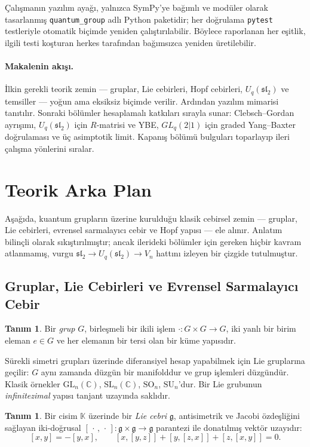 \documentclass[10pt]{math}
\numberwithin{equation}{section}
\theoremstyle{plain}
\theoremstyle{definition}
\newtheorem{definition}[theorem]{Tanım}
\renewcommand{\sl}{\mathfrak{sl}}
\newcommand{\gfrak}{\mathfrak{g}}
\newcommand{\Uq}{U_q(\sl_2)}
\newcommand{\K}{\mathbb{K}}
\newcommand{\C}{\mathbb{C}}
\newcommand{\GL}{\mathrm{GL}}
\newcommand{\SL}{\mathrm{SL}}
\begin{document}
Çalışmanın yazılım ayağı, yalnızca SymPy'ye bağımlı ve modüler olarak
tasarlanmış \texttt{quantum\_group} adlı Python paketidir; her doğrulama
\texttt{pytest} testleriyle otomatik biçimde yeniden çalıştırılabilir. Böylece raporlanan her eşitlik, ilgili
testi koşturan herkes tarafından bağımsızca yeniden üretilebilir.

\paragraph{Makalenin akışı.} İlkin gerekli teorik zemin --- gruplar, Lie
cebirleri, Hopf cebirleri, $\Uq$ ve temsiller --- yoğun ama eksiksiz biçimde
verilir. Ardından yazılım mimarisi tanıtılır. Sonraki bölümler hesaplamalı
katkıları sırayla sunar: Clebsch--Gordan ayrışımı, $\Uq$ için $R$-matrisi ve
YBE, $GL_q(2|1)$ için graded Yang--Baxter doğrulaması ve üç asimptotik limit.
Kapanış bölümü bulguları toparlayıp ileri çalışma yönlerini sıralar.

\section{Teorik Arka Plan}

Aşağıda, kuantum grupların üzerine kurulduğu klasik cebirsel zemin --- gruplar,
Lie cebirleri, evrensel sarmalayıcı cebir ve Hopf yapısı --- ele alınır.
Anlatım bilinçli olarak sıkıştırılmıştır; ancak ilerideki bölümler için gereken
hiçbir kavram atlanmamış, vurgu $\sl_2 \to \Uq \to V_n$ hattını izleyen bir
çizgide tutulmuştur.

\subsection{Gruplar, Lie Cebirleri ve Evrensel Sarmalayıcı Cebir}

\begin{definition}
Bir \emph{grup} $G$, birleşmeli bir ikili işlem $\cdot : G \times G \to G$,
iki yanlı bir birim eleman $e \in G$ ve her elemanın bir tersi olan bir
küme yapısıdır.
\end{definition}

Sürekli simetri grupları üzerinde diferansiyel hesap yapabilmek için Lie
gruplarına geçilir: $G$ aynı zamanda düzgün bir manifolddur ve grup
işlemleri düzgündür. Klasik örnekler $\GL_n(\C)$, $\SL_n(\C)$,
$\mathrm{SO}_n$, $\mathrm{SU}_n$'dur. Bir Lie grubunun \emph{infinitezimal}
yapısı tanjant uzayında saklıdır.

\begin{definition}
Bir cisim $\K$ üzerinde bir \emph{Lie cebri} $\gfrak$, antisimetrik ve Jacobi
özdeşliğini sağlayan iki-doğrusal $[\,\cdot\,,\,\cdot\,] : \gfrak \times \gfrak \to \gfrak$
parantezi ile donatılmış vektör uzayıdır:
\[
  [x,y] = -[y,x], \qquad
  [x,[y,z]] + [y,[z,x]] + [z,[x,y]] = 0.
\]
\end{definition}
\end{document}
